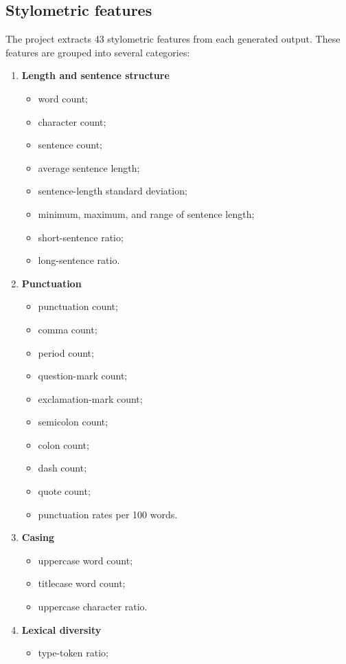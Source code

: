 \subsection{Stylometric features}
The project extracts 43 stylometric features from each generated output. These features are grouped into several categories:
\begin{enumerate}
  \item \textbf{Length and sentence structure}
  \begin{itemize}
    \item word count;
    \item character count;
    \item sentence count;
    \item average sentence length;
    \item sentence-length standard deviation;
    \item minimum, maximum, and range of sentence length;
    \item short-sentence ratio;
    \item long-sentence ratio.
  \end{itemize}
  \item \textbf{Punctuation}
  \begin{itemize}
    \item punctuation count;
    \item comma count;
    \item period count;
    \item question-mark count;
    \item exclamation-mark count;
    \item semicolon count;
    \item colon count;
    \item dash count;
    \item quote count;
    \item punctuation rates per 100 words.
  \end{itemize}
  \item \textbf{Casing}
  \begin{itemize}
    \item uppercase word count;
    \item titlecase word count;
    \item uppercase character ratio.
  \end{itemize}
  \item \textbf{Lexical diversity}
  \begin{itemize}
    \item type-token ratio;

\end{itemize}
\end{enumerate}
